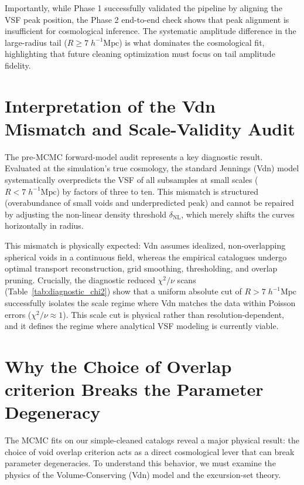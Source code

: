 \documentclass[12pt]{report}
\begin{document}
Importantly, while Phase 1 successfully validated the pipeline by aligning the VSF peak position, the Phase 2 end-to-end check shows that peak alignment is insufficient for cosmological inference. The systematic amplitude difference in the large-radius tail ($R \ge 7\;h^{-1}\mathrm{Mpc}$) is what dominates the cosmological fit, highlighting that future cleaning optimization must focus on tail amplitude fidelity.

\section{Interpretation of the Vdn Mismatch and Scale-Validity Audit}

The pre-MCMC forward-model audit represents a key diagnostic result. Evaluated at the simulation's true cosmology, the standard Jennings (Vdn) model systematically overpredicts the VSF of all subsamples at small scales ($R < 7\;h^{-1}\mathrm{Mpc}$) by factors of three to ten. This mismatch is structured (overabundance of small voids and underpredicted peak) and cannot be repaired by adjusting the non-linear density threshold $\delta_{\mathrm{NL}}$, which merely shifts the curves horizontally in radius.

This mismatch is physically expected: Vdn assumes idealized, non-overlapping spherical voids in a continuous field, whereas the empirical catalogues undergo optimal transport reconstruction, grid smoothing, thresholding, and overlap pruning. Crucially, the diagnostic reduced $\chi^2/\nu$ scans (Table~\ref{tab:diagnostic_chi2}) show that a uniform absolute cut of $R > 7\;h^{-1}\mathrm{Mpc}$ successfully isolates the scale regime where Vdn matches the data within Poisson errors ($\chi^2/\nu \approx 1$). This scale cut is physical rather than resolution-dependent, and it defines the regime where analytical VSF modeling is currently viable.

\section{Why the Choice of Overlap criterion Breaks the Parameter Degeneracy}
\label{sec:discussion_degeneracy}

The MCMC fits on our simple-cleaned catalogs reveal a major physical result: the choice of void overlap criterion acts as a direct cosmological lever that can break parameter degeneracies. To understand this behavior, we must examine the physics of the Volume-Conserving (Vdn) model and the excursion-set theory.
\end{document}
